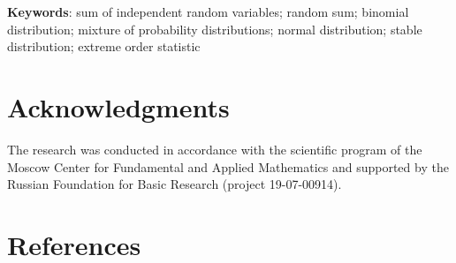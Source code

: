 \documentclass[14pt,a4paper]{extarticle}
\begin{document}
\medskip



{\bf Keywords}: sum of independent random variables; random sum; binomial distribution; mixture of probability distributions; normal distribution; stable distribution; extreme order statistic







\section*{Acknowledgments}

The research was conducted in accordance with the scientific program of the Moscow Center for Fundamental and Applied Mathematics and supported by the Russian Foundation for Basic Research (project 19-07-00914).





\section*{References}
\end{document}
